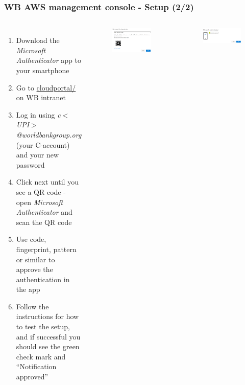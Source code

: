 \documentclass[aspectratio=169]{beamer} %
\begin{document}
\begin{frame}
	\frametitle{WB AWS management console - Setup (2/2)}
	\begin{columns}[c]


		\begin{enumerate}
			\item Download the \textit{Microsoft Authenticator} app to your smartphone
			\item Go to \href{https://cloudportal.worldbank.org/}{cloudportal/} 
			on WB intranet
			\item Log in using \textit{c$<$UPI$>$@worldbankgroup.org}
			(your C-account) and your new password
			\item Click next until you see a QR code
			- open \textit{Microsoft Authenticator} and scan the QR code
			\item Use code, fingerprint, pattern or similar
			to approve the authentication in the app
			\item Follow the instructions for how to test the setup,
			and if successful you should see 
			the green check mark and ``Notification approved''

		\end{enumerate}

		\begin{figure}
			\centering
			\includegraphics[width=1\textwidth]{./img/microsoft-auth-1.png}
		\end{figure}
			\begin{figure}
			\centering
			\includegraphics[width=1\textwidth]{./img/microsoft-auth-2.png}
		\end{figure}

	\end{columns}
\end{frame}
\end{document}
